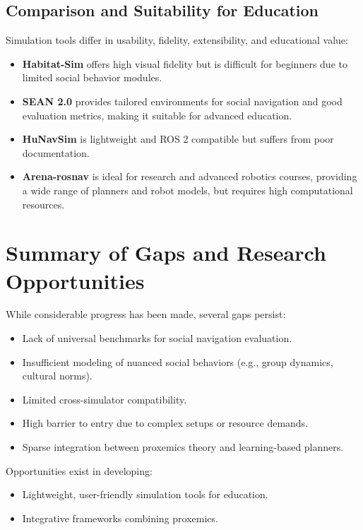
\subsection{Comparison and Suitability for Education}
Simulation tools differ in usability, fidelity, extensibility, and educational value:
\begin{itemize}
\item \textbf{Habitat-Sim} offers high visual fidelity but is difficult for beginners due 
to limited social behavior modules.
\item \textbf{SEAN 2.0} provides tailored environments for social navigation and good 
evaluation metrics, making it suitable for advanced education.
\item \textbf{HuNavSim} is lightweight and ROS 2 compatible but suffers from poor 
documentation.
\item \textbf{Arena-rosnav} is ideal for research and advanced robotics courses, providing 
a wide range of planners and robot models, but requires high computational resources.
\end{itemize}

\section{Summary of Gaps and Research Opportunities}

While considerable progress has been made, several gaps persist:
\begin{itemize}
\item Lack of universal benchmarks for social navigation evaluation.
\item Insufficient modeling of nuanced social behaviors (e.g., group dynamics, cultural norms).
\item Limited cross-simulator compatibility.
\item High barrier to entry due to complex setups or resource demands.
\item Sparse integration between proxemics theory and learning-based planners.
\end{itemize}

Opportunities exist in developing:
\begin{itemize}
\item Lightweight, user-friendly simulation tools for education.
\item Integrative frameworks combining proxemics.
\end{itemize}